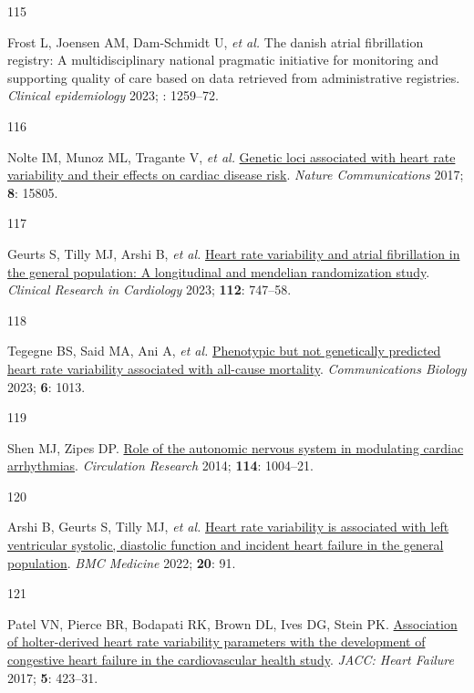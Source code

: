 \documentclass[
  a4paper,
  headsepline=true,
  open=left]{scrbook}
\newlength{\cslhangindent}
\newlength{\csllabelwidth}
\newlength{\cslentryspacingunit} %
\newenvironment{CSLReferences}[2] %
 {%
  \setlength{\parindent}{0pt}
  \ifodd #1
  \let\oldpar\par
  \def\par{\hangindent=\cslhangindent\oldpar}
  \fi
  \setlength{\parskip}{#2\cslentryspacingunit}
 }%
 {}
\newcommand{\CSLLeftMargin}[1]{\parbox[t]{\csllabelwidth}{#1}}
\newcommand{\CSLRightInline}[1]{\parbox[t]{\linewidth - \csllabelwidth}{#1}\break}
\begin{document}
\begin{CSLReferences}{0}{0}
\leavevmode{}%
\CSLLeftMargin{115 }%
\CSLRightInline{Frost L, Joensen AM, Dam-Schmidt U, \emph{et al.} The
danish atrial fibrillation registry: A multidisciplinary national
pragmatic initiative for monitoring and supporting quality of care based
on data retrieved from administrative registries. \emph{Clinical
epidemiology} 2023; : 1259--72.}

\leavevmode{}%
\CSLLeftMargin{116 }%
\CSLRightInline{Nolte IM, Munoz ML, Tragante V, \emph{et al.}
\href{https://doi.org/10.1038/ncomms15805}{Genetic loci associated with
heart rate variability and their effects on cardiac disease risk}.
\emph{Nature Communications} 2017; \textbf{8}: 15805.}

\leavevmode{}%
\CSLLeftMargin{117 }%
\CSLRightInline{Geurts S, Tilly MJ, Arshi B, \emph{et al.}
\href{https://doi.org/10.1007/s00392-022-02072-5}{Heart rate variability
and atrial fibrillation in the general population: A longitudinal and
mendelian randomization study}. \emph{Clinical Research in Cardiology}
2023; \textbf{112}: 747--58.}

\leavevmode{}%
\CSLLeftMargin{118 }%
\CSLRightInline{Tegegne BS, Said MA, Ani A, \emph{et al.}
\href{https://doi.org/10.1038/s42003-023-05376-y}{Phenotypic but not
genetically predicted heart rate variability associated with all-cause
mortality}. \emph{Communications Biology} 2023; \textbf{6}: 1013.}

\leavevmode{}%
\CSLLeftMargin{119 }%
\CSLRightInline{Shen MJ, Zipes DP.
\href{https://doi.org/10.1161/CIRCRESAHA.113.302549}{Role of the
autonomic nervous system in modulating cardiac arrhythmias}.
\emph{Circulation Research} 2014; \textbf{114}: 1004--21.}

\leavevmode{}%
\CSLLeftMargin{120 }%
\CSLRightInline{Arshi B, Geurts S, Tilly MJ, \emph{et al.}
\href{https://doi.org/10.1186/s12916-022-02273-9}{Heart rate variability
is associated with left ventricular systolic, diastolic function and
incident heart failure in the general population}. \emph{BMC Medicine}
2022; \textbf{20}: 91.}

\leavevmode{}%
\CSLLeftMargin{121 }%
\CSLRightInline{Patel VN, Pierce BR, Bodapati RK, Brown DL, Ives DG,
Stein PK. \href{https://doi.org/10.1016/j.jchf.2016.12.015}{Association
of holter-derived heart rate variability parameters with the development
of congestive heart failure in the cardiovascular health study}.
\emph{JACC: Heart Failure} 2017; \textbf{5}: 423--31.}


\end{CSLReferences}
\end{document}
